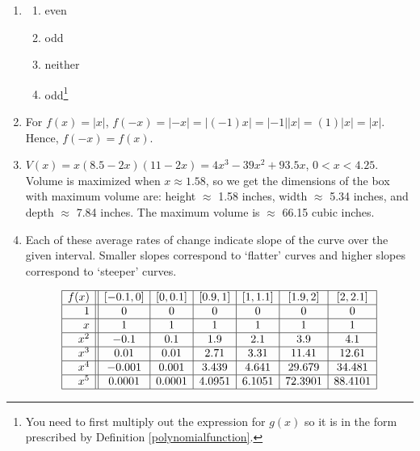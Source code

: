 \begin{enumerate}
\setcounter{enumi}{\value{HW}}

\addtocounter{enumi}{1}

\item  \begin{multicols}{4}
\begin{enumerate}

\item even

\item  odd

\item  neither

\item  odd\footnote{You need to first multiply out the expression for $g(x)$ so it is in the form prescribed by Definition \ref{polynomialfunction}.}

\end{enumerate}

\end{multicols}

\item For $f(x) = |x|$, $f(-x) = |-x| = |(-1) x|  = |-1| |x| = (1) |x| = |x|$.  Hence, $f(-x) = f(x)$.

\item  $V(x) = x(8.5-2x)(11-2x) = 4x^3-39x^2+93.5x$, $0 < x < 4.25$.  Volume is maximized when $x \approx 1.58$, so we get the dimensions of the box with maximum volume are: height $\approx$ 1.58 inches, width $\approx$ 5.34 inches, and depth $\approx$ 7.84 inches.  The maximum volume is $\approx$ 66.15 cubic inches.

\item  Each of these average rates of change indicate slope of the curve over the given interval.  Smaller slopes correspond to `flatter' curves and higher slopes correspond to `steeper' curves.

\[ \begin{array}{|r||c|c|c|c|c|c|}  \hline

 f(x) &  [-0.1, 0] & [0, 0.1] &[0.9, 1] & [1, 1.1] & [1.9, 2] & [2, 2.1]  \\ \hline
 1 &  0 &   0  & 0   & 0   & 0  & 0 \\  \hline
 x &  1 &   1  & 1   & 1   & 1  & 1 \\  \hline
 x^2 & -0.1 & 0.1 & 1.9 & 2.1 & 3.9 & 4.1  \\  \hline
 x^3 & 0.01  & 0.01 & 2.71 & 3.31 & 11.41 & 12.61 \\  \hline
 x^4&  -0.001 & 0.001 & 3.439 & 4.641 & 29.679 & 34.481 \\ \hline
 x^5 & 0.0001 & 0.0001 & 4.0951 & 6.1051 & 72.3901 & 88.4101 \\ \hline


\end{array}\]
\end{enumerate}
